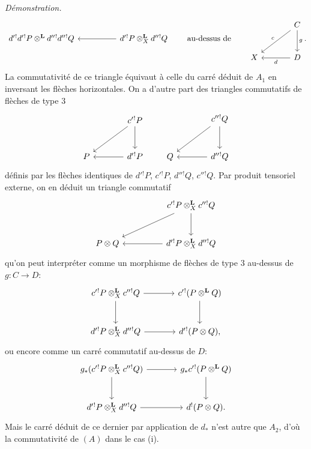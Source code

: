 \documentclass[11pt]{article}
\newenvironment{prooftext}[1][Proof]{\par\noindent\emph{#1.}\ }{\par\medskip}
\begin{document}
\begin{prooftext}[Démonstration]
\[\begin{tikzcd}[column sep=huge,row sep=large]
d'{}^!d'{}^!P\otimes^{\mathbf L}d''{}^!d''{}^!Q &
d'{}^!P\otimes_X^{\mathbf L}d''{}^!Q\arrow[l]
\end{tikzcd}
\qquad\text{au-dessus de}\qquad
\begin{tikzcd}[column sep=large,row sep=large]
& C\arrow[d,"g"]\arrow[dl,"c"']\\
X & D\arrow[l,"d"]
\end{tikzcd}.
\]
La commutativité de ce triangle équivaut à celle du carré déduit de $A_1$ en inversant les flèches horizontales. On a d'autre part des triangles commutatifs de flèches de type $3$
\[
\begin{tikzcd}[column sep=large,row sep=large]
& c'{}^!P \arrow[d]\arrow[dl]\\
P & d'{}^!P\arrow[l]
\end{tikzcd}
\qquad
\begin{tikzcd}[column sep=large,row sep=large]
& c''{}^!Q \arrow[d]\arrow[dl]\\
Q & d''{}^!Q\arrow[l]
\end{tikzcd}
\]
définis par les flèches identiques de $d'{}^!P$, $c'{}^!P$, $d''{}^!Q$, $c''{}^!Q$. Par produit tensoriel externe, on en déduit un triangle commutatif
\[
\begin{tikzcd}[column sep=huge,row sep=large]
& c'{}^!P\otimes_X^{\mathbf L}c''{}^!Q \arrow[d]\arrow[dl]\\
P\otimes Q & d'{}^!P\otimes_X^{\mathbf L}d''{}^!Q\arrow[l]
\end{tikzcd}
\]
qu'on peut interpréter comme un morphisme de flèches de type $3$ au-dessus de $g:C\longrightarrow D$:
\[
\begin{tikzcd}[column sep=large,row sep=large]
c'{}^!P\otimes_X^{\mathbf L}c''{}^!Q \arrow[r]\arrow[d] &
c'{}^!(P\otimes^{\mathbf L}Q)\arrow[d]\\
d'{}^!P\otimes_X^{\mathbf L}d''{}^!Q \arrow[r] &
d'{}^!(P\otimes Q),
\end{tikzcd}
\]
ou encore comme un carré commutatif au-dessus de $D$:
\[
\begin{tikzcd}[column sep=large,row sep=large]
g_*(c'{}^!P\otimes_X^{\mathbf L}c''{}^!Q) \arrow[r]\arrow[d] &
g_*c'{}^!(P\otimes^{\mathbf L}Q)\arrow[d]\\
d'{}^!P\otimes_X^{\mathbf L}d''{}^!Q \arrow[r] &
d^!(P\otimes Q).
\end{tikzcd}
\]
Mais le carré déduit de ce dernier par application de $d_*$ n'est autre que $A_2$, d'où la commutativité de $(A)$ dans le cas (i).


\end{prooftext}
\end{document}
